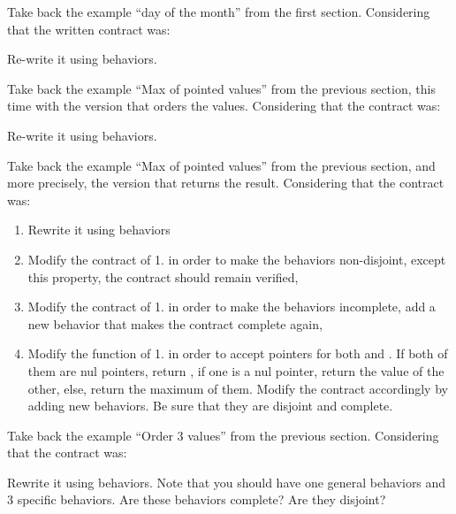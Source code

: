Take back the example ``day of the month'' from the first section.
Considering that the written contract was:





Re-write it using behaviors.





Take back the example ``Max of pointed values'' from the previous section,
this time with the version that orders the values. Considering that the
contract was:






Re-write it using behaviors.






Take back the example ``Max of pointed values'' from the previous section,
and more precisely, the version that returns the result. Considering that
the contract was:






\begin{enumerate}
\item Rewrite it using behaviors
\item Modify the contract of 1. in order to make the behaviors non-disjoint,
  except this property, the contract should remain verified,
\item Modify the contract of 1. in order to make the behaviors incomplete,
  add a new behavior that makes the contract complete again,
\item Modify the function of 1. in order to accept  pointers
  for both  and . If both of them are nul pointers,
  return , if one is a nul pointer, return the value of
  the other, else, return the maximum of them. Modify the contract accordingly
  by adding new behaviors. Be sure that they are disjoint and complete.
\end{enumerate}




Take back the example ``Order 3 values'' from the previous section. Considering
that the contract was:




Rewrite it using behaviors. Note that you should have one general behaviors
and 3 specific behaviors. Are these behaviors complete? Are they disjoint?
